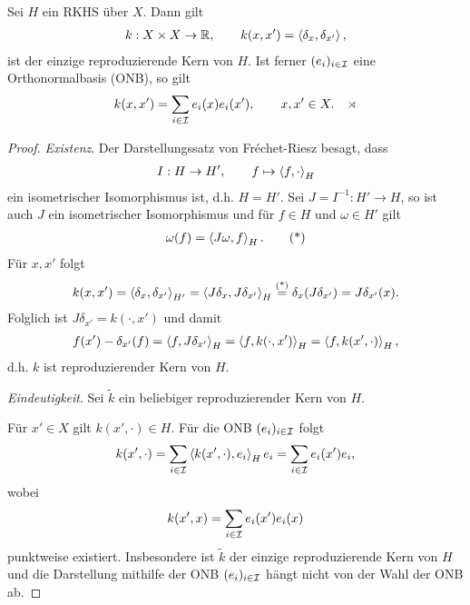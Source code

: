 \begin{prop}
\label{prop:5.2.3}
Sei $H$ ein RKHS über $X$. Dann gilt
\begin{align*}
k: X\times X\to \mathbb{R},\qquad
k(x,x')=\left\langle\delta_x,\delta_{x'}\right\rangle,
\end{align*}
ist der einzige reproduzierende Kern von $H$. Ist ferner $(e_i)_{i\in\mathcal{I}}$ eine
Orthonormalbasis (ONB), so gilt
\begin{align*}
k(x,x') = \sum_{i\in\II} e_i(x) e_i(x'),\qquad x,x'\in X.\fishhere
\end{align*}
\end{prop}
\begin{proof}
\textit{Existenz}. Der Darstellungssatz von Fréchet-Riesz besagt, dass
\begin{align*}
I : H\to H',\qquad f\mapsto \left\langle f,\cdot\right\rangle_H
\end{align*}
ein isometrischer Isomorphismus ist, d.h. $H=H'$. Sei $J=I^{-1}: H'\to H$, so
ist auch $J$ ein isometrischer Isomorphismus und  für $f\in H$ und $\omega\in
H'$ gilt
\begin{align*}
\omega(f) = \left\langle J\omega,f\right\rangle_H.\tag{*}
\end{align*}
Für $x,x'$ folgt
\begin{align*}
k(x,x') = \left\langle\delta_x,\delta_{x'}\right\rangle_{H'} = \left\langle J\delta_x,J\delta_{x'}\right\rangle_H
\overset{\text{(*)}}{=} \delta_x(J\delta_{x'}) = J\delta_{x'}(x).
\end{align*}
Folglich ist $J\delta_{x'} = k(\cdot,x')$ und damit
\begin{align*}
f(x') - \delta_{x'}(f) = \left\langle f,J\delta_{x'}\right\rangle_H = 
\left\langle f,k(\cdot,x')\right\rangle_H = \left\langle f,k(x',\cdot)\right\rangle_H,
\end{align*}
d.h. $k$ ist reproduzierender Kern von $H$.

\textit{Eindeutigkeit}. Sei $\tilde{k}$ ein beliebiger reproduzierender Kern von
$H$.

Für $x'\in X$ gilt $k(x',\cdot)\in H$. Für die ONB $(e_i)_{i\in\mathcal{I}}$ folgt
\begin{align*}
k(x',\cdot) = \sum_{i\in\mathcal{I}} \left\langle k(x',\cdot), e_i\right\rangle_He_i =
\sum_{i\in\mathcal{I}} e_i(x')e_i,
\end{align*}
wobei
\begin{align*}
k(x',x) = \sum_{i\in\mathcal{I} } e_i(x')e_i(x)
\end{align*}
punktweise existiert. Insbesondere ist $\tilde{k}$ der einzige reproduzierende
Kern von $H$ und die Darstellung mithilfe der ONB $(e_i)_{i\in\mathcal{I}}$ hängt nicht
von der Wahl der ONB ab.\qedhere
\end{proof}

